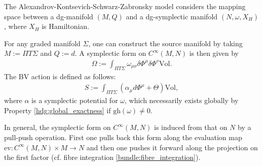     \begin{example}
        The Alexandrov-Kontsevich-Schwarz-Zabronsky model considers the mapping space between a dg-manifold $(M,Q)$ and a dg-symplectic manifold $(N,\omega,X_H)$, where $X_H$ is Hamiltonian.

        For any graded manifold $\Sigma$, one can construct the source manifold by taking $M:=\Pi T\Sigma$ and $Q:=d$. A symplectic form on $C^\infty(M,N)$ is then given by
        \begin{gather}
            \Omega := \int_{\Pi T\Sigma}\omega_{\mu\nu}\delta\Phi^\mu\delta\Phi^\nu\mathrm{Vol}.
        \end{gather}
        The BV action is defined as follows:
        \begin{gather}
            S := \int_{\Pi T\Sigma}\left(\alpha_\mu d\Phi^\mu+\Theta\right)\mathrm{Vol},
        \end{gather}
        where $\alpha$ is a symplectic potential for $\omega$, which necessarily exists globally by Property \ref{hdg:global_exactness} if $\mathrm{gh}(\omega)\neq0$.

        In general, the symplectic form on $C^\infty(M,N)$ is induced from that on $N$ by a pull-push operation. First one pulls back this form along the evaluation map $\mathrm{ev}:C^\infty(M,N)\times M\rightarrow N$ and then one pushes it forward along the projection on the first factor (cf. fibre integration \ref{bundle:fibre_integration}).
    \end{example}